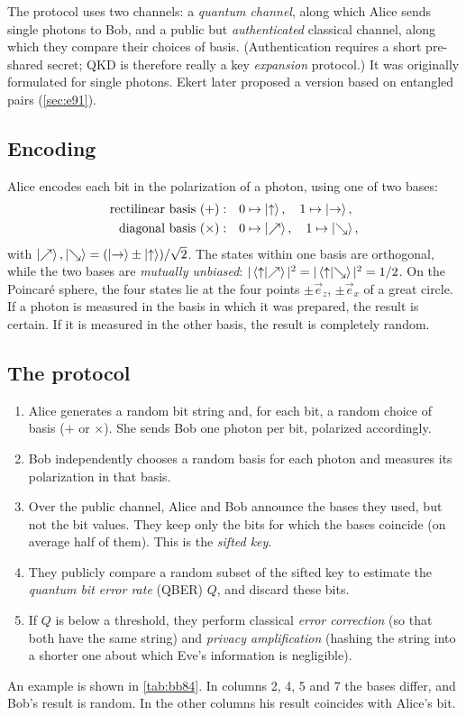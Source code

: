 The protocol uses two channels: a \emph{quantum channel}, along which Alice sends single photons to Bob, and a public but \emph{authenticated} classical
channel, along which they compare their choices of basis. (Authentication requires a short pre-shared secret; QKD is therefore really a key
\emph{expansion} protocol.) It was originally formulated for single photons. Ekert later proposed a version based on entangled pairs \cite{Ekert1991}
(\cref{sec:e91}).

\subsection{Encoding}
Alice encodes each bit in the polarization of a photon, using one of two bases:
\begin{align}
  \text{rectilinear basis }(+):&\quad 0\mapsto\left|\uparrow\right\rangle,\quad 1\mapsto\left|\rightarrow\right\rangle,\\
  \text{diagonal basis }(\times):&\quad 0\mapsto\left|\nearrow\right\rangle,\quad 1\mapsto\left|\searrow\right\rangle,
\end{align}
with $\left|\nearrow\right\rangle,\left|\searrow\right\rangle=(\left|\rightarrow\right\rangle\pm\left|\uparrow\right\rangle)/\sqrt2$. The states within one basis are orthogonal, while the two bases are
\emph{mutually unbiased}: $|\left\langle\uparrow\middle|\nearrow\right\rangle|^2=|\left\langle\uparrow\middle|\searrow\right\rangle|^2=1/2$. On the Poincaré sphere, the four states lie at the four points
$\pm\vec e_z$, $\pm\vec e_x$ of a great circle. If a photon is measured in the basis in which it was prepared, the result is certain. If it is measured in the
other basis, the result is completely random.

\subsection{The protocol}
\begin{enumerate}
  \item Alice generates a random bit string and, for each bit, a random choice of basis ($+$ or $\times$). She sends Bob one photon per bit, polarized accordingly.
  \item Bob independently chooses a random basis for each photon and measures its polarization in that basis.
  \item Over the public channel, Alice and Bob announce the bases they used, but not the bit values. They keep only the bits for which the bases coincide
  (on average half of them). This is the \emph{sifted key}.
  \item They publicly compare a random subset of the sifted key to estimate the \emph{quantum bit error rate} (QBER) $Q$, and discard these bits.
  \item If $Q$ is below a threshold, they perform classical \emph{error correction} (so that both have the same string) and \emph{privacy amplification}
  (hashing the string into a shorter one about which Eve's information is negligible).
\end{enumerate}
An example is shown in \cref{tab:bb84}. In columns 2, 4, 5 and 7 the bases differ, and Bob's result is random. In the other columns his result coincides with Alice's bit.

